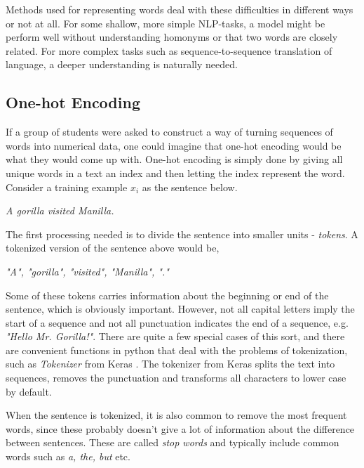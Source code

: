 Methods used for representing words deal with these difficulties in different ways or not at all. For some shallow, more simple NLP-tasks, a model might be perform well without understanding homonyms or that two words are closely related. For more complex tasks such as sequence-to-sequence translation of language, a deeper understanding is naturally needed. 

\subsection{One-hot Encoding}

If a group of students were asked to construct a way of turning  sequences of words into numerical data, one could imagine that one-hot encoding would be what they would come up with. One-hot encoding is simply done by giving all unique words in a text an index and then letting the index represent the word. Consider a training example $x_i$ as the sentence below. 

\begin{center}
    \textit{A gorilla visited Manilla.}    
\end{center}

The first processing needed is to divide the sentence into smaller units - \textit{tokens}. A tokenized version of the sentence above would be,

\begin{center}
    \textit{"A", "gorilla", "visited", "Manilla", "."}    
\end{center}

Some of these tokens carries information about the beginning or end of the sentence, which is obviously important. However, not all capital letters imply the start of a sequence and not all punctuation indicates the end of a sequence, e.g. \textit{"Hello Mr. Gorilla!"}. There are quite a few special cases of this sort, and there are convenient functions in python that deal with the problems of tokenization, such as \textit{Tokenizer} from Keras \citep{chollet2020keras}. The tokenizer from Keras splits the text into sequences, removes the punctuation and transforms all characters to lower case by default. 

When the sentence is tokenized, it is also common to remove the most frequent words, since these probably doesn't give a lot of information about the difference between sentences. These are called \textit{stop words} and typically include common words such as \textit{a, the, but} etc.

